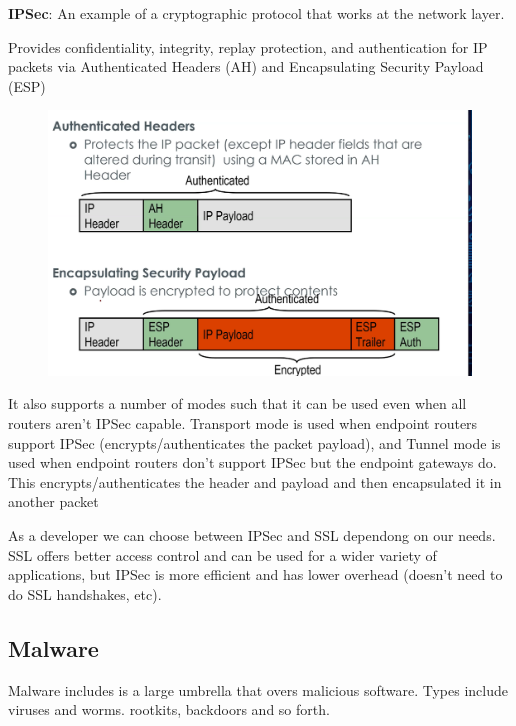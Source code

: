\documentclass[../notes.tex]{subfiles}
\begin{document}
\begin{definition}
    \textbf{IPSec}: An example of a cryptographic protocol that works at the network layer.

    Provides confidentiality, integrity, replay protection, and authentication for IP packets via Authenticated Headers (AH) and Encapsulating Security Payload (ESP)

    \begin{figure}[H]
        \centering
        \includegraphics[width=0.8\linewidth]{img/image_2023-03-30-03-42-19.png}
    \end{figure}

    It also supports a number of modes such that it can be used even when all routers aren't IPSec capable.
    Transport mode is used when endpoint routers support IPSec (encrypts/authenticates the packet payload), and Tunnel mode is used when endpoint routers don't support IPSec but the endpoint gateways do. This encrypts/authenticates the header and payload and then encapsulated it in another packet
\end{definition}

As a developer we can choose between IPSec and SSL dependong on our needs. SSL offers better access control and can be used for a wider variety of applications, but IPSec is more efficient and has lower overhead (doesn't need to do SSL handshakes, etc).




\subsection{Malware}


Malware includes is a large umbrella that overs malicious software. Types include viruses and worms. rootkits, backdoors and so forth.
\end{document}
